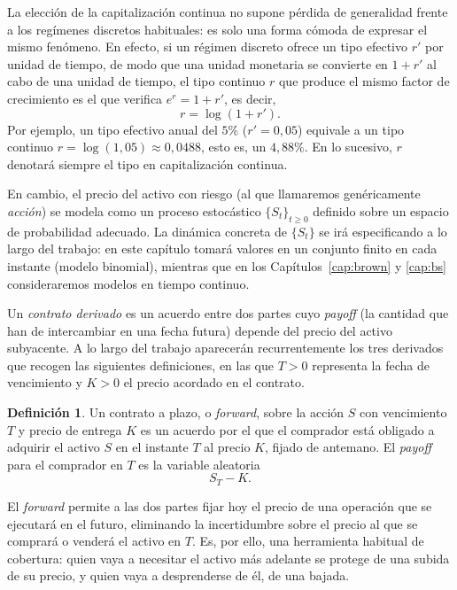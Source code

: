 \documentclass[11pt,a4paper,oneside]{report}
\theoremstyle{plain}
\theoremstyle{definition}
\newtheorem{definicion}[teorema]{Definición}
\theoremstyle{remark}
\newcommand{\1}{\mathbf{1}}
\begin{document}
La elección de la capitalización continua no supone pérdida de
generalidad frente a los regímenes discretos habituales: es solo una
forma cómoda de expresar el mismo fenómeno. En efecto, si un régimen
discreto ofrece un tipo efectivo $r'$ por unidad de tiempo, de modo
que una unidad monetaria se convierte en $1 + r'$ al cabo de una unidad
de tiempo, el tipo continuo $r$ que produce el mismo factor de
crecimiento es el que verifica $e^{r} = 1 + r'$, es decir,
\begin{equation*}
  r = \log(1 + r').
\end{equation*}
Por ejemplo, un tipo efectivo anual del $5\%$ ($r' = 0{,}05$) equivale a
un tipo continuo $r = \log(1{,}05) \approx 0{,}0488$, esto es, un
$4{,}88\%$. En lo sucesivo, $r$ denotará siempre el tipo en
capitalización continua.

En cambio, el precio del activo
con riesgo (al que llamaremos genéricamente \emph{acción}) se modela
como un proceso estocástico $\{S_t\}_{t \geq 0}$ definido sobre un
espacio de probabilidad adecuado. La dinámica concreta de $\{S_t\}$ se
irá especificando a lo largo del trabajo: en este capítulo tomará
valores en un conjunto finito en cada instante (modelo binomial),
mientras que en los Capítulos~\ref{cap:brown} y \ref{cap:bs}
consideraremos modelos en tiempo continuo.

Un \emph{contrato derivado} es un
acuerdo entre dos partes cuyo \emph{payoff} (la cantidad que han de
intercambiar en una fecha futura) depende del precio del activo
subyacente. A lo largo del trabajo aparecerán recurrentemente los tres
derivados que recogen las siguientes definiciones, en las que $T > 0$
representa la fecha de vencimiento y $K > 0$ el precio acordado en el
contrato.

\begin{definicion}
Un contrato a plazo, o \emph{forward}, sobre la acción $S$ con
vencimiento $T$ y precio de entrega $K$ es un acuerdo por el que el
comprador está obligado a adquirir el activo $S$ en el instante $T$ al
precio $K$, fijado de antemano. El \emph{payoff} para el comprador en
$T$ es la variable aleatoria
\begin{equation*}
  S_T - K.
\end{equation*}
\end{definicion}

El \emph{forward} permite a las dos partes fijar hoy el precio de una
operación que se ejecutará en el futuro, eliminando la incertidumbre
sobre el precio al que se comprará o venderá el activo en $T$. Es, por
ello, una herramienta habitual de cobertura: quien vaya a necesitar el
activo más adelante se protege de una subida de su precio, y quien vaya a
desprenderse de él, de una bajada.
\end{document}
